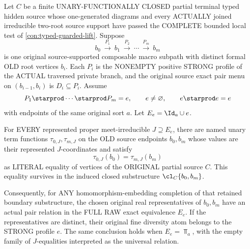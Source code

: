 \begin{lemma}
\label{lem:typed-old-gap-boundary-certificate}
Let \(C\) be a finite
UNARY-FUNCTIONALLY CLOSED
partial terminal typed
hidden source whose
one-generated diagrams
and every ACTUALLY
joined irreducible
two-root source support
have passed the COMPLETE
bounded local test of
\cref{con:typed-guarded-lift}.
Suppose
\[
 b_0 \ \xrightarrow{P_1}\
 b_1\ \xrightarrow{P_2}\
 \cdots\ \xrightarrow{P_m}\ b_m
\]
is one original
source-supported
composable macro
subpath with distinct
formal OLD root
vertices \(b_i\).
Each \(P_i\) is the
NONEMPTY positive
STRONG profile of the
ACTUAL traversed
private branch, and
the original source
exact pair menu on
\((b_{i-1},b_i)\)
is \(D_i\subseteq P_i\).
Assume
\[
       P_1\starprod
           \cdots\starprod P_m=e,
       \qquad e\ne\varnothing,
       \qquad e\starprod e=e
\]
with endpoints of the
same original sort \(a\).
Let
\(E_e=\Id_a\cup e\).

For EVERY represented
proper meet-irreducible
\(J\supseteq E_e\),
there are named unary
term functions
\(\tau_{0,J},\tau_{m,J}\)
on the OLD source
endpoints \(b_0,b_m\)
whose values are their
represented \(J\)-coordinates
and satisfy
\[
             \tau_{0,J}(b_0)
                        =\tau_{m,J}(b_m)
\tag{OGC}\label{eq:typed-old-gap-certificate}
\]
as LITERAL equality of
vertices of the ORIGINAL
partial source \(C\).
This equality survives
in the induced closed
substructure
\(\cl_C\{b_0,b_m\}\).

Consequently, for ANY
homomorphism-embedding
completion of that
retained boundary
substructure, the
chosen original real
representatives of
\(b_0,b_m\) have an
actual pair relation
in the FULL RAW exact
equivalence \(E_e\).
If the representatives
are distinct, their
original fine diversity
atom belongs to the
STRONG profile \(e\).
The same conclusion
holds when \(E_e=\Top_a\),
with the empty family
of \(J\)-equalities
interpreted as the
universal relation.
\end{lemma}
